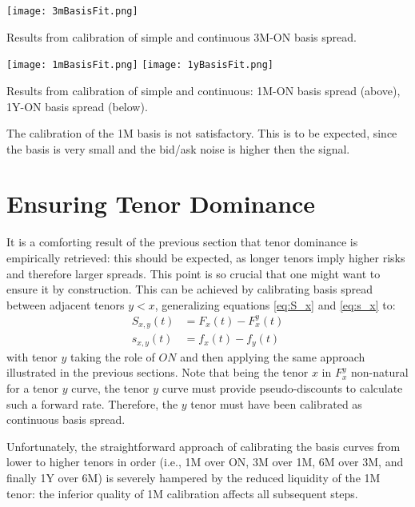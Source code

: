 \documentclass{article}
\begin{document}
\begin{table}[p]
\centering
\texttt{[image: 3mBasisFit.png]}
\caption{Results from calibration of simple and continuous 3M-ON basis spread.}
\label{3mBasisFit}
\end{table}

\begin{table}[p]
\centering
\texttt{[image: 1mBasisFit.png]}\vfill
\texttt{[image: 1yBasisFit.png]}
\caption{Results from calibration of simple and continuous: 1M-ON basis spread (above), 1Y-ON basis spread (below).}
\label{1mBasisFit}
\end{table}

The calibration of the 1M basis is not satisfactory. This is to be expected, since the basis is very small and the bid/ask noise is higher then the signal.

\section{Ensuring Tenor Dominance}
\label{sec:ensuring-tenor-dominance}

It is a comforting result of the previous section that tenor dominance is empirically retrieved: this should be expected, as longer tenors imply higher risks and therefore larger spreads. This point is so crucial that one might want to ensure it by construction. This can be achieved by calibrating basis spread between adjacent tenors $y<x$, generalizing equations \ref{eq:S_x} and \ref{eq:s_x} to:
\begin{equation}
\begin{split}
S_{x,y}(t) &= F_x(t) - F_x^{y}(t)\\
s_{x,y}(t) &= f_x(t) - f_{y}(t)
\end{split}
\end{equation}
with tenor $y$ taking the role of $ON$ and then applying the same approach illustrated in the previous sections.
Note that being the tenor $x$ in $F_x^{y}$ non-natural for a tenor $y$ curve, the tenor $y$ curve must provide pseudo-discounts to calculate such a forward rate. Therefore, the $y$ tenor must have been calibrated as continuous basis spread.

Unfortunately, the straightforward approach of calibrating the basis curves from lower to higher tenors in order (i.e., 1M over ON, 3M over 1M, 6M over 3M, and finally 1Y over 6M) is severely hampered by the reduced liquidity of the 1M tenor: the inferior quality of 1M calibration affects all subsequent steps.
\end{document}
